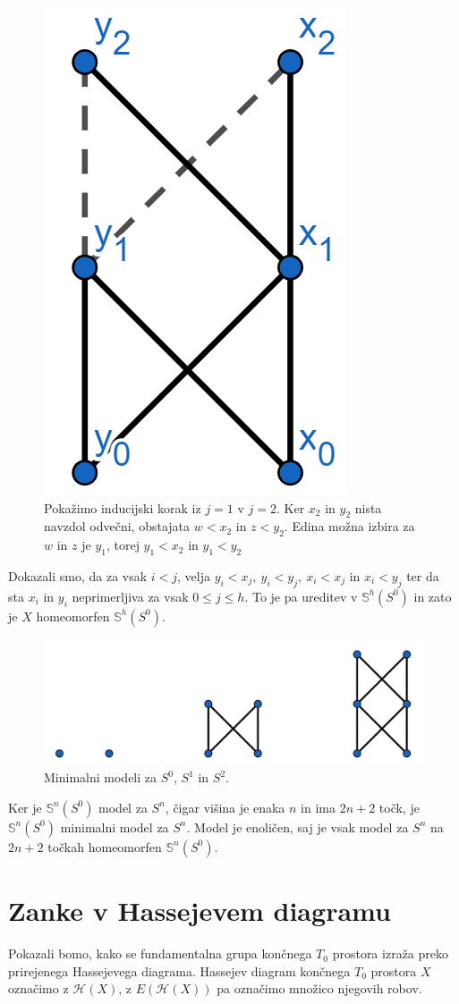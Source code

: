 \documentclass[mat1]{fmfdelo}
\DeclareRobustCommand{\h}{
    \mathcal{H}}
\newcommand{\Sus}{\mathbb S}
\begin{document}
\begin{dokaz}
          
          \begin{figure}[h!]
            \centering
            \includegraphics[width=0.2\linewidth]{minsfera-zadnja.png}
          \caption{Pokažimo inducijski korak iz $j=1$ v $j=2$. Ker $x_2$ in $y_2$ nista navzdol odvečni, obstajata $w<x_2$ in $z<y_2$. Edina možna izbira za $w$ in $z$ je $y_1$, torej $y_1<x_2$ in $y_1<y_2$}
          \end{figure}
  
          Dokazali smo, da za vsak $i<j$,  velja $y_i < x_j,\ y_i < y_j,\ x_i < x_j$ in
$x_i < y_j$ ter da sta $x_i$ in $y_i$ neprimerljiva za vsak $0\leq j \leq h$.
To je pa ureditev v $\Sus^h(S^0)$ in zato je $X$ homeomorfen 
    $\Sus^h(S^0)$.
  
\end{dokaz}

\begin{figure}[h]
    \centering
    \includegraphics[width=0.8\linewidth]{sfere.png}
    \caption{Minimalni modeli za $S^0$, $S^1$ in $S^2$.}
\end{figure}

Ker je $\Sus^n(S^0)$ model za $S^n$, čigar višina je enaka $n$ in ima 
$2n+2$ točk, je $\Sus^n(S^0)$ minimalni model za $S^n$. Model je 
enoličen, saj je vsak model za $S^n$ na $2n+2$ točkah homeomorfen 
$\Sus^n(S^0)$.
\section{Zanke v Hassejevem diagramu}\label{sec:hasse}

Pokazali bomo, kako se fundamentalna grupa končnega $T_0$ 
prostora izraža preko prirejenega Hassejevega diagrama.
Hassejev diagram končnega $T_0$ prostora $X$ označimo z 
$\h(X)$, z $E(\h(X))$ pa označimo množico njegovih robov.
\end{document}
